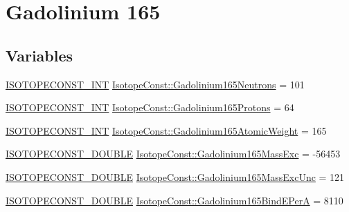 \hypertarget{group___isotope_const-_gadolinium-_gd165}{}\section{Gadolinium 165}
\label{group___isotope_const-_gadolinium-_gd165}
\subsection*{Variables}
\begin{DoxyCompactItemize}
\item 
\mbox{\hyperlink{group___isotope_const-_macros_ga5f18360b3e99483a35c32d789e62621c}{I\+S\+O\+T\+O\+P\+E\+C\+O\+N\+S\+T\+\_\+\+I\+NT}} \mbox{\hyperlink{group___isotope_const-_gadolinium-_gd165_gaff3554dfe9bef15ac0d1ae5a4dab81d3}{Isotope\+Const\+::\+Gadolinium165\+Neutrons}} = 101
\item 
\mbox{\hyperlink{group___isotope_const-_macros_ga5f18360b3e99483a35c32d789e62621c}{I\+S\+O\+T\+O\+P\+E\+C\+O\+N\+S\+T\+\_\+\+I\+NT}} \mbox{\hyperlink{group___isotope_const-_gadolinium-_gd165_ga32cd5306dd0a9ac5f60a87e8bec68f0a}{Isotope\+Const\+::\+Gadolinium165\+Protons}} = 64
\item 
\mbox{\hyperlink{group___isotope_const-_macros_ga5f18360b3e99483a35c32d789e62621c}{I\+S\+O\+T\+O\+P\+E\+C\+O\+N\+S\+T\+\_\+\+I\+NT}} \mbox{\hyperlink{group___isotope_const-_gadolinium-_gd165_gacf41316159680ad2eee49ab340197c16}{Isotope\+Const\+::\+Gadolinium165\+Atomic\+Weight}} = 165
\item 
\mbox{\hyperlink{group___isotope_const-_macros_ga8f45a7272ce02c0b4c65c44636ed719a}{I\+S\+O\+T\+O\+P\+E\+C\+O\+N\+S\+T\+\_\+\+D\+O\+U\+B\+LE}} \mbox{\hyperlink{group___isotope_const-_gadolinium-_gd165_gae990f8d29261ea382b87bca40e54708e}{Isotope\+Const\+::\+Gadolinium165\+Mass\+Exc}} = -\/56453
\item 
\mbox{\hyperlink{group___isotope_const-_macros_ga8f45a7272ce02c0b4c65c44636ed719a}{I\+S\+O\+T\+O\+P\+E\+C\+O\+N\+S\+T\+\_\+\+D\+O\+U\+B\+LE}} \mbox{\hyperlink{group___isotope_const-_gadolinium-_gd165_ga1b2ff61408b162673a41387fc2b6da99}{Isotope\+Const\+::\+Gadolinium165\+Mass\+Exc\+Unc}} = 121
\item 
\mbox{\hyperlink{group___isotope_const-_macros_ga8f45a7272ce02c0b4c65c44636ed719a}{I\+S\+O\+T\+O\+P\+E\+C\+O\+N\+S\+T\+\_\+\+D\+O\+U\+B\+LE}} \mbox{\hyperlink{group___isotope_const-_gadolinium-_gd165_ga2e3afb69500eced4826d7925ac15037e}{Isotope\+Const\+::\+Gadolinium165\+Bind\+E\+PerA}} = 8110
\item 

\end{DoxyCompactItemize}

